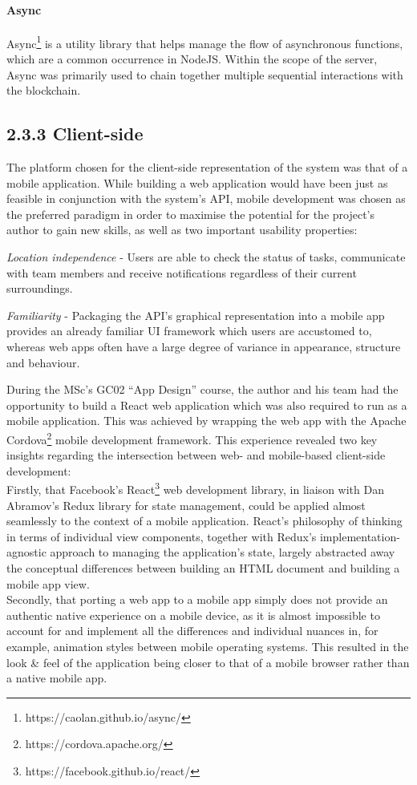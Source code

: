 \paragraph{Async}\label{async}

Async\footnote{https://caolan.github.io/async/} is a utility
library that helps manage the flow of asynchronous functions, which are
a common occurrence in NodeJS. Within the scope of the server, Async was
primarily used to chain together multiple sequential interactions with
the blockchain.

\subsection{2.3.3 Client-side}\label{client-side}

The platform chosen for the client-side representation of the system was
that of a mobile application. While building a web application would
have been just as feasible in conjunction with the system's API, mobile
development was chosen as the preferred paradigm in order to maximise
the potential for the project's author to gain new skills, as well as
two important usability properties:

\emph{Location independence} - Users are able to check the status of
tasks, communicate with team members and receive notifications
regardless of their current surroundings.

\emph{Familiarity} - Packaging the API's graphical representation into a
mobile app provides an already familiar UI framework which users are
accustomed to, whereas web apps often have a large degree of variance in
appearance, structure and behaviour.

During the MSc's GC02 ``App Design'' course, the author and his team had
the opportunity to build a React web application which was also required
to run as a mobile application. This was achieved by wrapping the web
app with the Apache Cordova\footnote{https://cordova.apache.org/}
mobile development framework. This experience revealed two key insights
regarding the intersection between web- and mobile-based client-side
development:\\
Firstly, that Facebook's
React\footnote{https://facebook.github.io/react/} web development
library, in liaison with Dan Abramov's
Redux\cite{1redux} library for state management,
could be applied almost seamlessly to the context of a mobile
application. React's philosophy of thinking in terms of individual view
components, together with Redux's implementation-agnostic approach to
managing the application's state, largely abstracted away the conceptual
differences between building an HTML document and building a mobile app
view.\\
Secondly, that porting a web app to a mobile app simply does not provide
an authentic native experience on a mobile device, as it is almost
impossible to account for and implement all the differences and
individual nuances in, for example, animation styles between mobile
operating systems. This resulted in the look \& feel of the application
being closer to that of a mobile browser rather than a native mobile
app.

